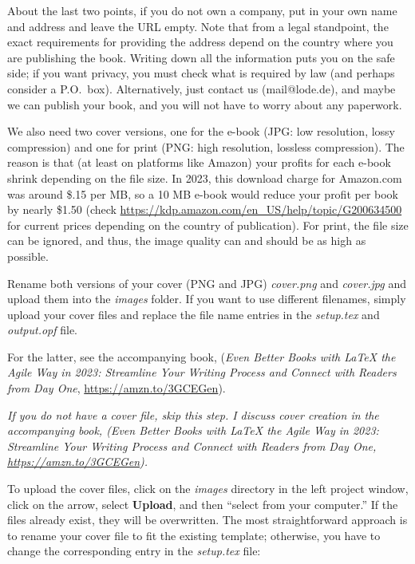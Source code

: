 About the last two points, if you do not own a company, put in your own name and address and leave the URL empty. Note that from a legal standpoint, the exact requirements for providing the address depend on the country where you are publishing the book. Writing down all the information puts you on the safe side; if you want privacy, you must check what is required by law (and perhaps consider a P.O.~box). Alternatively, just contact us (mail@lode.de), and maybe we can publish your book, and you will not have to worry about any paperwork.

We also need two cover versions, one for the e-book (JPG: low resolution, lossy compression) and one for print (PNG: high resolution, lossless compression). The reason is that (at least on platforms like Amazon) your profits for each e-book shrink depending on the file size. In 2023, this download charge for Amazon.com was around \${}.15 per MB, so a 10 MB e-book would reduce your profit per book by nearly \${}1.50 (check \url{https://kdp.amazon.com/en_US/help/topic/G200634500} for current prices depending on the country of publication). For print, the file size can be ignored, and thus, the image quality can and should be as high as possible.

Rename both versions of your cover (PNG and JPG) \textit{cover.png} and \textit{cover.jpg} and upload them into the \textit{images} folder. If you want to use different filenames, simply upload your cover files and replace the file name entries in the \textit{setup.tex} and \textit{output.opf} file.

For the latter, see the accompanying book, (\textit{Even Better Books with LaTeX the Agile Way in 2023: Streamline Your Writing Process and Connect with Readers from Day One}, \url{https://amzn.to/3GCEGen}).

\textit{If you do not have a cover file, skip this step. I discuss cover creation in the accompanying book, (\textit{Even Better Books with LaTeX the Agile Way in 2023: Streamline Your Writing Process and Connect with Readers from Day One}, \url{https://amzn.to/3GCEGen}).}

To upload the cover files, click on the \textit{images} directory in the left project window, click on the arrow, select \textbf{Upload}, and then ``select from your computer.'' If the files already exist, they will be overwritten. The most straightforward approach is to rename your cover file to fit the existing template; otherwise, you have to change the corresponding entry in the \textit{setup.tex} file:

